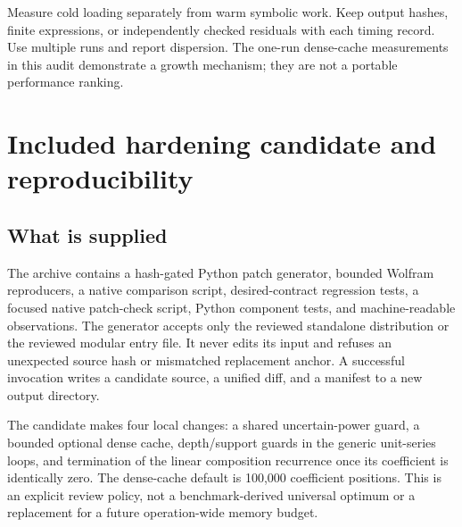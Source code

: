 \documentclass[11pt,a4paper]{article}
\newcommand{\code}[1]{\texttt{\detokenize{#1}}}
\begin{document}
Measure cold loading separately from warm symbolic work. Keep output hashes, finite expressions, or independently checked residuals with each timing record. Use multiple runs and report dispersion. The one-run dense-cache measurements in this audit demonstrate a growth mechanism; they are not a portable performance ranking.

\section{Included hardening candidate and reproducibility}
\label{sec:patch}

\subsection{What is supplied}
The archive contains a hash-gated Python patch generator, bounded Wolfram reproducers, a native comparison script, desired-contract regression tests, a focused native patch-check script, Python component tests, and machine-readable observations. The generator accepts only the reviewed standalone distribution or the reviewed modular entry file. It never edits its input and refuses an unexpected source hash or mismatched replacement anchor. A successful invocation writes a candidate source, a unified diff, and a manifest to a new output directory.

The candidate makes four local changes: a shared uncertain-power guard, a bounded optional dense \code{SeriesData} cache, depth/support guards in the generic unit-series loops, and termination of the linear composition recurrence once its coefficient is identically zero. The dense-cache default is 100,000 coefficient positions. This is an explicit review policy, not a benchmark-derived universal optimum or a replacement for a future operation-wide memory budget.
\end{document}
